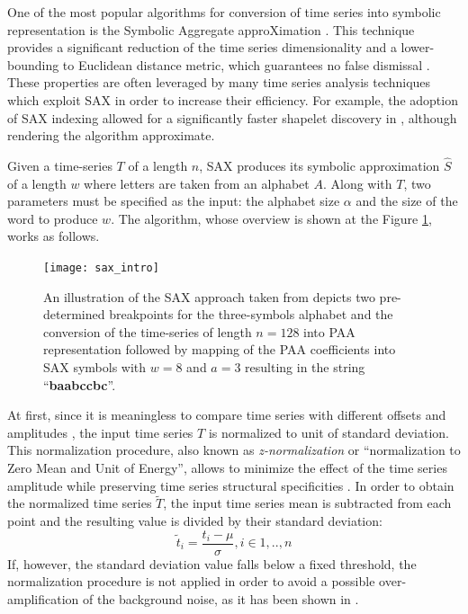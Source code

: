 One of the most popular algorithms for conversion of time series into symbolic representation is the Symbolic Aggregate approXimation \cite{sax}. 
This technique provides a significant reduction of the time series dimensionality and a lower-bounding to Euclidean distance 
metric, which guarantees no false dismissal \cite{citeulike:2821475}. 
These properties are often leveraged by many time series analysis techniques which exploit SAX in order to increase their efficiency. 
For example, the adoption of SAX indexing allowed for a significantly faster shapelet discovery in \cite{citeulike:12563493}, 
although rendering the algorithm approximate. 

Given a time-series $T$ of a length $n$, SAX produces its symbolic approximation $\hat{S}$ of a length $w$ where letters are taken 
from an alphabet $A$. Along with $T$, two parameters must be specified as the input: the alphabet size $\alpha$ and the size of 
the word to produce $w$. The algorithm, whose overview is shown at the Figure \ref{fig:sax_intro}, works as follows. 

\begin{figure}[tbp]
   \centering
   \texttt{[image: sax\_intro]}
   \caption{An illustration of the SAX approach taken from \cite{citeulike:2821475} depicts two pre-determined breakpoints for the 
   three-symbols alphabet and the conversion of the time-series of length $n=128$ into PAA representation followed by mapping of 
   the PAA coefficients into SAX symbols with $w=8$ and $a=3$ resulting in the string ``\textbf{baabccbc}''.}
   \label{fig:sax_intro}
\end{figure}

At first, since it is meaningless to compare time series with different offsets and amplitudes \cite{citeulike:532340}, the input time 
series $T$ is normalized to unit of standard deviation. This normalization procedure, also known as \textit{z-normalization} or 
``normalization to Zero Mean and Unit of Energy'', allows to minimize the effect of the time series amplitude while preserving time 
series structural specificities \cite{citeulike:3815880}. In order to obtain the normalized time series $\widetilde{T}$, the 
input time series mean is subtracted from each point and the resulting value is divided by their standard deviation:
\begin{equation}
\widetilde{t}_{i} = \frac{t_{i}-\mu}{\sigma}, i \in {1,..,n}
\label{eq:znorm}
\end{equation}
If, however, the standard deviation value falls below a fixed threshold, the normalization procedure is not applied in order to avoid 
a possible over-amplification of the background noise, as it has been shown in \cite{citeulike:2821475}.

